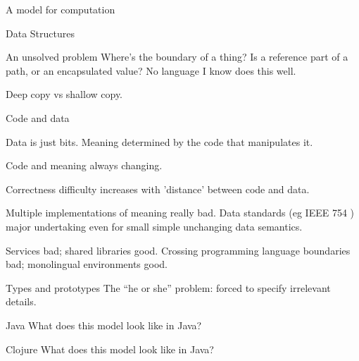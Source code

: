 \begin{plSection}{A model for computation}
\begin{plSection}{Data Structures}
\begin{plSection}{An unsolved problem}
Where's the boundary of a thing? 
Is a reference part of a path, or
an encapsulated value?
No language I know does this well.

Deep copy vs shallow copy.
\end{plSection}
\end{plSection}
\begin{plSection}{Code and data}

Data is just bits. 
Meaning determined by the code that manipulates it. 

Code and meaning always changing.

Correctness difficulty increases
with 'distance' between code and data. 

Multiple implementations of meaning really bad.
Data standards (eg {IEEE} 754 \cite{Higham:2002:ASNA, 
IEEE:1985:P754, IEEE:2008:P754, IEEE:2019:P754, IEEE:2020:60559,
MullerEtal:2010:FPHandbook}) major undertaking even for
small simple unchanging data semantics.

Services bad; shared libraries good.
Crossing programming language boundaries bad; 
monolingual environments \cite{HeeringKlint:1985:Monlingual} good.
\end{plSection}
\begin{plSection}{Types and prototypes}
The ``he or she'' problem: forced to specify irrelevant details.
\end{plSection}
\begin{plSection}{Java}
What does this model look like in Java?
\end{plSection}
\begin{plSection}{Clojure}
What does this model look like in Java?
\end{plSection}
\end{plSection}
